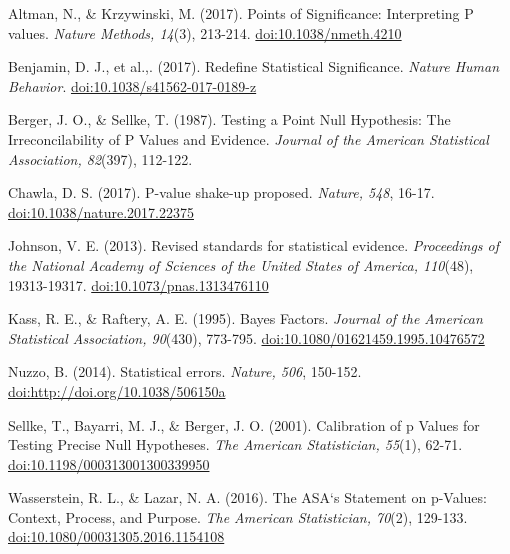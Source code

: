 \documentclass[]{article}
\begin{document}
Altman, N., \& Krzywinski, M. (2017). Points of Significance:
Interpreting P values. \emph{Nature Methods, 14}(3), 213-214.
\url{doi:10.1038/nmeth.4210}

Benjamin, D. J., et al.,. (2017). Redefine Statistical Significance.
\emph{Nature Human Behavior}. \url{doi:10.1038/s41562-017-0189-z}

Berger, J. O., \& Sellke, T. (1987). Testing a Point Null Hypothesis:
The Irreconcilability of P Values and Evidence. \emph{Journal of the
American Statistical Association, 82}(397), 112-122.

Chawla, D. S. (2017). P-value shake-up proposed. \emph{Nature, 548},
16-17. \url{doi:10.1038/nature.2017.22375}

Johnson, V. E. (2013). Revised standards for statistical evidence.
\emph{Proceedings of the National Academy of Sciences of the United
States of America, 110}(48), 19313-19317.
\url{doi:10.1073/pnas.1313476110}

Kass, R. E., \& Raftery, A. E. (1995). Bayes Factors. \emph{Journal of
the American Statistical Association, 90}(430), 773-795.
\url{doi:10.1080/01621459.1995.10476572}

Nuzzo, B. (2014). Statistical errors. \emph{Nature, 506}, 150-152.
\url{doi:http://doi.org/10.1038/506150a}

Sellke, T., Bayarri, M. J., \& Berger, J. O. (2001). Calibration of p
Values for Testing Precise Null Hypotheses. \emph{The American
Statistician, 55}(1), 62-71. \url{doi:10.1198/000313001300339950}

Wasserstein, R. L., \& Lazar, N. A. (2016). The ASA`s Statement on
p-Values: Context, Process, and Purpose. \emph{The American
Statistician, 70}(2), 129-133. \url{doi:10.1080/00031305.2016.1154108}
\end{document}
